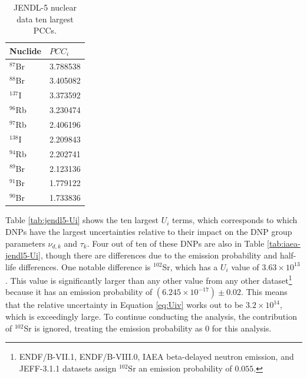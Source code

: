 \begin{table}[]
    \centering
    \caption{JENDL-5 nuclear data ten largest \glspl{PCC}.}
    \begin{tabular}{ll}
        \hline
       Nuclide & $PCC_{i}$ \\
       \hline
       $^{87}$Br & 3.788538 \\
       $^{88}$Br & 3.405082 \\
       $^{137}$I & 3.373592 \\
       $^{96}$Rb & 3.230474 \\
       $^{97}$Rb & 2.406196 \\
       $^{138}$I & 2.209843 \\
       $^{94}$Rb & 2.202741 \\
       $^{89}$Br & 2.123136 \\
       $^{91}$Br & 1.779122 \\
       $^{90}$Br & 1.733836 \\
        \hline
    \end{tabular}
    \label{tab:jendl5-PCCi}
\end{table}

Table \ref{tab:jendl5-Ui} shows the ten largest $U_i$ terms, which corresponds to which \glspl{DNP} have the largest uncertainties relative to their impact on the \gls{DNP} group parameters $\nu_{d,k}$ and $\tau_k$.
Four out of ten of these \glspl{DNP} are also in Table \ref{tab:iaea-jendl5-Ui}, though there are differences due to the emission probability and half-life differences.
One notable difference is $^{102}$Sr, which has a $U_i$ value of $3.63 \times 10^{13}$.
This value is significantly larger than any other value from any other dataset\footnote{ENDF/B-VII.1, ENDF/B-VIII.0, IAEA beta-delayed neutron emission, and JEFF-3.1.1 datasets assign $^{102}$Sr an emission probability of $0.055$.} because it has an emission probability of $(6.245 \times 10^{-17}) \pm 0.02$.
This means that the relative uncertainty in Equation \eqref{eq:Uiv} works out to be $3.2 \times 10^{14}$, which is exceedingly large.
To continue conducting the analysis, the contribution of $^{102}$Sr is ignored, treating the emission probability as 0 for this analysis.

